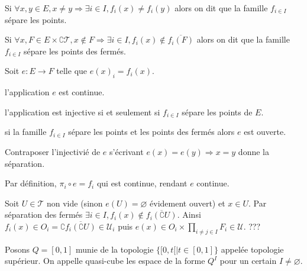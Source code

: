 \documentclass[a4paper, 11pt, french]{book}
\newenvironment{itemise}{\itemize}{\enditemize}
\theoremstyle{plain} %
\theoremstyle{definition} %
\theoremstyle{remark} %
\newcommand{\1}{\mathds{1}}
\newcommand\vide{\varnothing}
\begin{document}
Si $\forall x, y\in E, x\neq y\Rightarrow\exists i\in I, f_i(x)\neq f_i(y)$ alors on dit que la famille $f_{i\in I}$ sépare les points.

Si $\forall x, F\in E\times\complement\mathscr{T}, x\notin F\Rightarrow\exists i\in I, f_i(x)\notin\overline{f_i(F)}$ alors on dit que la famille $f_{i\in I}$ sépare les points des fermés.

\proposition
Soit $e:E\rightarrow F$ telle que $e(x)_i=f_i(x)$.
\begin{itemise}
	\item l'application $e$ est continue.
	\item l'application est injective si et seulement si $f_{i\in I}$ sépare les points de $E$.
	\item si la famille $f_{i\in I}$ sépare les points et les points des fermés alors $e$ est ouverte.
\end{itemise}
\demonstration
\begin{itemise}
	\item Contraposer l'injectivié de $e$ s'écrivant $e(x)=e(y)\Rightarrow x=y$ donne la séparation.
	\item Par définition, $\pi_i\circ e=f_i$  qui est continue, rendant $e$ continue.
	\item Soit $U\in\mathscr{T}$ non vide (sinon $e(U)=\vide$ évidement ouvert) et $x\in U$.
	Par séparation des fermés $\exists i\in I, f_i(x)\notin\overline{f_i(\complement U)}$.
	Ainsi $f_i(x)\in O_i=\complement\overline{f_i(\complement U)}\in\mathscr{U}_i$ puis $e(x)\in O_i\times\prod_{i\neq j\in I}F_i\in\mathscr{U}$.
	{\color{red} ???}
\end{itemise}

Posons $Q=[0, 1]$ munie de la topologie $\{[0, t[|t\in[0, 1]\}$ appelée topologie supérieur.
On appelle quasi-cube les espace de la forme $Q^I$ pour un certain $I\neq\vide$.

\iffalse
\proposition
L'espace $Q$ est $T_0$, quasi-compact mais pas $T_1$.
\demonstration
\begin{itemise}
	\item Soit $x, y\in Q$ différents, supposons par exemple $y>x$.
	Alors pour $t=\frac{x+y}{2}$ on a $x\in[0, t[$ et $y\notin[0, t[$.
	\item Soit $U=\bigcup_{i\in I}[0, t_i[$ une réunion d'ouverts.
	Alors pour $t=\max_{i\in I}t_i$ on a $U=[0,t[$.
	\item L'intersection de deux ouverts contient toujours 0.
\end{itemise}
\fi
\end{document}
